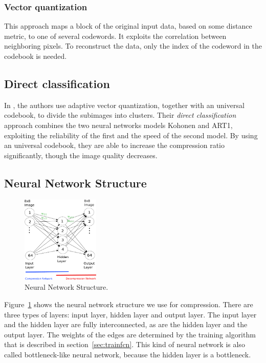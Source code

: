 \subsubsection{Vector quantization}
This approach maps a block of the original input data, based on some distance metric, to one of several codewords. It exploits the correlation between neighboring pixels. To reconstruct the data, only the index of the codeword in the codebook is needed. 

\subsection{Direct classification}
In \cite{Soliman2006258}, the authors use adaptive vector quantization, together with an universal codebook, to divide the subimages into clusters. Their \emph{direct classification} approach combines the two neural networks models Kohonen and ART1, exploiting the reliability of the first and the speed of the second model. By using an universal codebook, they are able to increase the compression ratio significantly, though the image quality decreases.

\subsection{Neural Network Structure} \label{sec:neural_net_structure}
\begin{figure}[tbp]
  \centering
  \includegraphics[width=0.33\textwidth]{images/nnStructure}
  \caption{Neural Network Structure.}
  \label{fig:nnStructure}
\end{figure}

Figure~\ref{fig:nnStructure} shows the neural network structure we use for compression. There are three types of layers: input layer, hidden layer and output layer. The input layer and the hidden layer are fully interconnected, as are the hidden layer and the output layer. The weights of the edges are determined by the training algorithm that is described in section~\ref{sec:trainfcn}. This kind of neural network is also called bottleneck-like neural network, because the hidden layer is a bottleneck.


